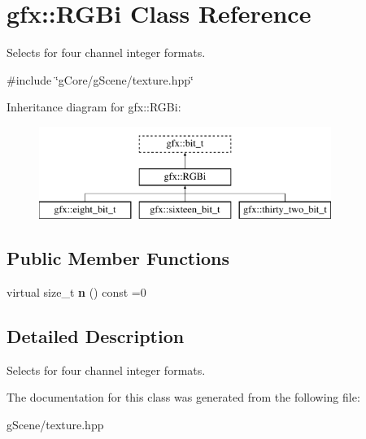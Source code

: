 \hypertarget{classgfx_1_1RGBi}{\section{gfx\-:\-:R\-G\-Bi Class Reference}
\label{classgfx_1_1RGBi}
}


Selects for four channel integer formats.  




{\ttfamily \#include \char`\"{}g\-Core/g\-Scene/texture.\-hpp\char`\"{}}

Inheritance diagram for gfx\-:\-:R\-G\-Bi\-:\begin{figure}[H]
\begin{center}
\leavevmode
\includegraphics[height=3.000000cm]{classgfx_1_1RGBi}
\end{center}
\end{figure}
\subsection*{Public Member Functions}
\begin{DoxyCompactItemize}
\item 
\hypertarget{classgfx_1_1RGBi_a0e5d42e77bed28e5148e8c3f371ea562}{virtual size\-\_\-t {\bfseries n} () const =0}\label{classgfx_1_1RGBi_a0e5d42e77bed28e5148e8c3f371ea562}

\end{DoxyCompactItemize}


\subsection{Detailed Description}
Selects for four channel integer formats. 

The documentation for this class was generated from the following file\-:\begin{DoxyCompactItemize}
\item 
g\-Scene/texture.\-hpp\end{DoxyCompactItemize}
